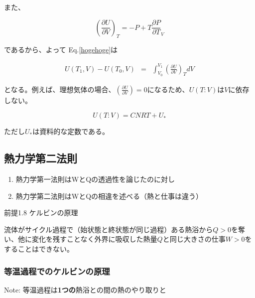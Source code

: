 また、

\begin{equation}
  \left(\frac{\partial U}{\partial V}\right)_T = -P + T \frac{\partial P}{\partial T}_V
\end{equation}

であるから、よって Eq.\ref{hogehoge}は

\begin{eqnarray}
  U(T_1, V) - U(T_0, V) 
     &=& \int_{V_0}^{V_1} \left(\frac{\partial U}{\partial V}\right)_T dV
  \label{hogehoge}
\end{eqnarray}

となる。例えば、理想気体の場合、$\left(\frac{\partial U}{\partial V}\right) = 0$になるため、$U(T:V)$は$V$に依存しない。

\begin{equation}
  U(T:V) = CNRT + U_*
\end{equation}

ただし$U_*$は資料的な定数である。

\subsection*{熱力学第二法則}

\begin{enumerate}
  \item 熱力学第一法則はWとQの透過性を論じたのに対し
  \item 熱力学第二法則はWとQの相違を述べる（熱と仕事は違う）
\end{enumerate}

前提1.8 ケルビンの原理

流体がサイクル過程で（始状態と終状態が同じ過程）ある熱浴から$Q>0$を奪い、他に変化を残すことなく外界に吸収した熱量$Q$と同じ大きさの仕事$W>0$をすることはできない。

\subsubsection{等温過程でのケルビンの原理}

Note: 等温過程は\textbf{1つの}熱浴との間の熱のやり取りと